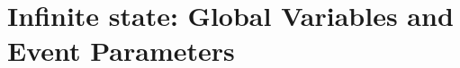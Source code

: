\documentclass[12pt]{article}
\begin{document}
%
%
%
%
%









\section{Infinite state: Global Variables and Event Parameters} \label{globalvars}
\end{document}
